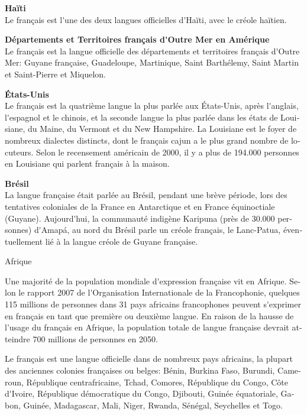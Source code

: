 \documentclass[]{../metanetpaper}
\begin{document}
\begin{french}
\begin{multicols}{2}
{\bf Haïti}\\
Le français est l{\mbox '}une des deux langues officielles d{\mbox
 '}Haïti, avec le créole haïtien.

{\bf Départements et Territoires français d{\mbox '}Outre Mer en Amérique}\\
Le français est la langue officielle des départements et territoires
français d{\mbox '}Outre Mer: Guyane française, Guadeloupe,
Martinique, Saint Barthélemy, Saint Martin et Saint-Pierre et
Miquelon.

{\bf États-Unis}\\
Le français est la quatrième langue la plus parlée aux États-Unis,
après l{\mbox '}anglais, l{\mbox '}espagnol et le chinois, et la
seconde langue la plus parlée dans les états de Louisiane, du Maine,
du Vermont et du New Hampshire. La Louisiane est le foyer de nombreux
dialectes distincts, dont le français cajun a le plus grand nombre de
locuteurs. Selon le recensement américain de 2000, il y a plus de
194.000 personnes en Louisiane qui parlent français à la maison.

{\bf Brésil}\\
La langue française était parlée au Brésil, pendant une brève période,
lors des tentatives coloniales de la France en Antarctique et en
France équinoctiale (Guyane). Aujourd{\mbox '}hui, la communauté indigène
Karipuna (près de 30.000 personnes) d{\mbox '}Amapá, au nord du Brésil
parle un créole français, le Lanc-Patua, éventuellement lié à la
langue créole de Guyane française.

\begin{center}
{\sc Afrique}
\end{center}

Une majorité de la population mondiale d{\mbox '}expression française
vit en Afrique. Selon le rapport 2007 de l{\mbox '}Organisation
Internationale de la Francophonie, quelques 115 millions de personnes
dans 31 pays africains francophones peuvent s{\mbox '}exprimer en
français en tant que première ou deuxième langue. En raison de la
hausse de l'usage du français en Afrique, la population totale de langue
française devrait atteindre 700 millions de personnes en 2050.

Le français est une langue officielle dans de nombreux pays africains,
la plupart des anciennes colonies françaises ou belges: Bénin, Burkina
Faso, Burundi, Cameroun, République centrafricaine, Tchad, Comores,
République du Congo, Côte d{\mbox '}Ivoire, République démocratique du
Congo, Djibouti, Guinée équatoriale, Gabon, Guinée, Madagascar, Mali,
Niger, Rwanda, Sénégal, Seychelles et Togo.


\end{multicols}
\end{french}
\end{document}
